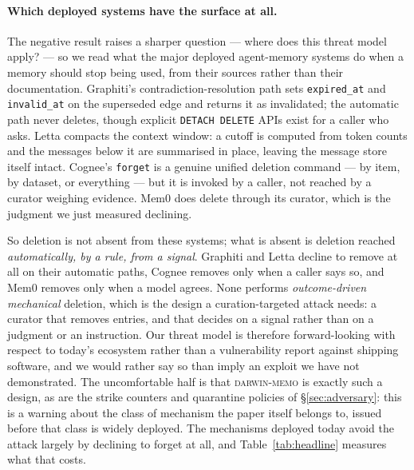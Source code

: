 \paragraph{Which deployed systems have the surface at all.}
The negative result raises a sharper question --- where does this threat
model apply? --- so we read what the major deployed agent-memory systems
do when a memory should stop being used, from their sources rather than
their documentation. Graphiti's contradiction-resolution path sets
\texttt{expired\_at} and \texttt{invalid\_at} on the superseded edge and
returns it as invalidated; the automatic path never deletes, though
explicit \texttt{DETACH DELETE} APIs exist for a caller who asks. Letta
compacts the context window: a cutoff is computed from token counts and
the messages below it are summarised in place, leaving the message store
itself intact. Cognee's \texttt{forget} is a genuine unified deletion
command --- by item, by dataset, or everything --- but it is invoked by
a caller, not reached by a curator weighing evidence. Mem0 does delete
through its curator, which is the judgment we just measured declining.

So deletion is not absent from these systems; what is absent is deletion
reached \emph{automatically, by a rule, from a signal}. Graphiti and
Letta decline to remove at all on their automatic paths, Cognee removes
only when a caller says so, and Mem0 removes only when a model agrees.
None performs \emph{outcome-driven mechanical} deletion, which is the
design a curation-targeted attack needs: a curator that removes entries,
and that decides on a signal rather than on a judgment or an
instruction. Our
threat model is therefore forward-looking with respect to today's
ecosystem rather than a vulnerability report against shipping software,
and we would rather say so than imply an exploit we have not
demonstrated. The uncomfortable half is that \textsc{darwin-memo} is
exactly such a design, as are the strike counters and quarantine
policies of \S\ref{sec:adversary}: this is a warning about the class of
mechanism the paper itself belongs to, issued before that class is
widely deployed. The mechanisms deployed today avoid the attack largely
by declining to forget at all, and Table~\ref{tab:headline} measures
what that costs.

